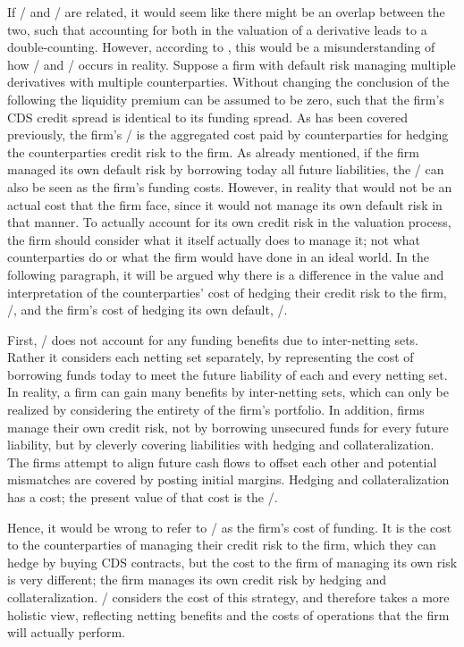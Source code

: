 \documentclass[main.tex]{subfiles}
\begin{document}
    If \DVA/ and \FVA/ are related, it would seem like there might be an overlap between the two,
    such that accounting for both in the valuation of a derivative leads to a double-counting.
    However, according to \textcite{Ruiz2015XVA}, 
    this would be a misunderstanding of how \DVA/ and \FVA/ occurs in reality.
    Suppose a firm with default risk managing multiple derivatives with multiple counterparties.
    Without changing the conclusion of the following the liquidity premium can be assumed to be zero, 
    such that the firm's CDS credit spread is identical to its funding spread.
    As has been covered previously, the firm's \DVA/ is the aggregated cost
    paid by counterparties for hedging the counterparties credit risk to the firm.
    As already mentioned, if the firm managed its own default risk 
    by borrowing today all future liabilities,
    the \DVA/ can also be seen as the firm's funding costs.
    However, in reality that would not be an actual cost that the firm face,
    since it would not manage its own default risk in that manner.
    To actually account for its own credit risk in the valuation process,
    the firm should consider what it itself actually does to manage it;
    not what counterparties do or what the firm would have done in an ideal world.
    In the following paragraph, it will be argued why there is a difference 
    in the value and interpretation 
    of the counterparties' cost of hedging their credit risk to the firm, \DVA/,
    and the firm's cost of hedging its own default, \FVA/.

    First, \DVA/ does not account for any funding benefits due to inter-netting sets.
    Rather it considers each netting set separately, by representing the cost 
    of borrowing funds today to meet the future liability of each and every netting set.
    In reality, a firm can gain many benefits by inter-netting sets,
    which can only be realized by considering the entirety of the firm's portfolio.
    In addition, firms manage their own credit risk,
    not by borrowing unsecured funds for every future liability,
    but by cleverly covering liabilities
    with hedging and collateralization.
    The firms attempt to align future cash flows to offset each other
    and potential mismatches are covered by posting initial margins. 
    Hedging and collateralization has a cost; 
    the present value of that cost is the \FVA/.

    Hence, it would be wrong to refer to \DVA/ as the firm's cost of funding.
    It is the cost to the counterparties of managing their credit risk to the firm,
    which they can hedge by buying CDS contracts,
    but the cost to the firm of managing its own risk is very different;
    the firm manages its own credit risk by hedging and collateralization.
    \FVA/ considers the cost of this strategy, and therefore takes a more holistic view, 
    reflecting netting benefits and the costs of operations that the firm will actually perform.
\end{document}
